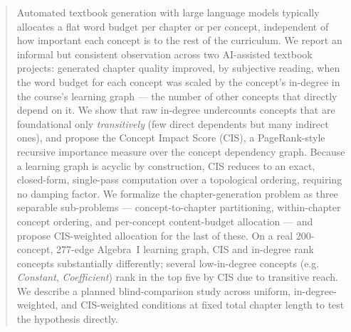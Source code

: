 
\begin{abstract}
Automated textbook generation with large language models typically allocates
a flat word budget per chapter or per concept, independent of how important
each concept is to the rest of the curriculum. We report an informal but
consistent observation across two AI-assisted textbook projects: generated
chapter quality improved, by subjective reading, when the word budget for
each concept was scaled by the concept's in-degree in the course's learning
graph --- the number of other concepts that directly depend on it. We show
that raw in-degree undercounts concepts that are foundational only
\emph{transitively} (few direct dependents but many indirect ones), and
propose the Concept Impact Score (CIS), a PageRank-style recursive importance
measure over the concept dependency graph. Because a learning graph is
acyclic by construction, CIS reduces to an exact, closed-form, single-pass
computation over a topological ordering, requiring no damping factor. We
formalize the chapter-generation problem as three separable sub-problems ---
concept-to-chapter partitioning, within-chapter concept ordering, and
per-concept content-budget allocation --- and propose CIS-weighted
allocation for the last of these. On a real 200-concept, 277-edge Algebra~I
learning graph, CIS and in-degree rank concepts substantially differently;
several low-in-degree concepts (e.g. \emph{Constant}, \emph{Coefficient})
rank in the top five by CIS due to transitive reach. We describe a planned
blind-comparison study across uniform, in-degree-weighted, and CIS-weighted
conditions at fixed total chapter length to test the hypothesis directly.

\end{abstract}
